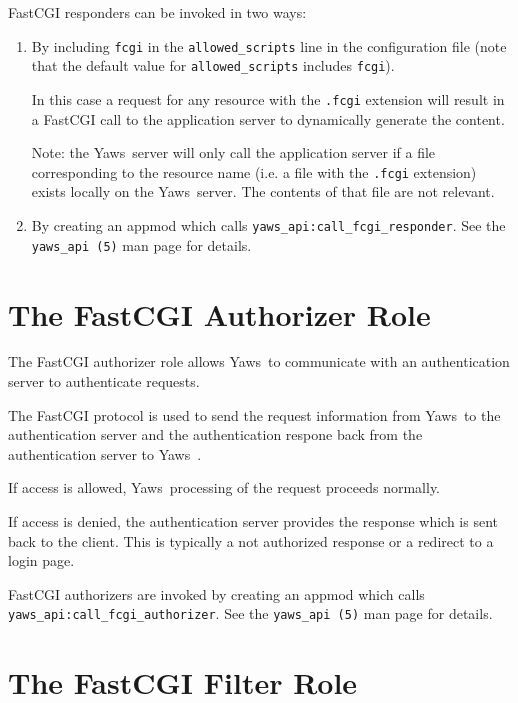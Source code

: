 \documentclass[11pt,oneside,english]{book}
\newcommand{\Yaws}            %
        {{\sc Yaws}}
\begin{document}
FastCGI responders can be invoked in two ways:

\begin{enumerate}

\item
By including \verb+fcgi+ in the \verb+allowed_scripts+ line
in the configuration file (note that the default value for
\verb+allowed_scripts+ includes \verb+fcgi+).

In this case a request for any resource with the \verb+.fcgi+
extension will result in a FastCGI call to the application server to
dynamically generate the content.

Note: the \Yaws\  server will only call the application server if a file
corresponding to the resource name (i.e. a file with the \verb+.fcgi+
extension) exists locally on the \Yaws\  server. The contents of that
file are not relevant.

\item
By creating an appmod which calls \verb+yaws_api:call_fcgi_responder+.
See the \verb+yaws_api (5)+ man page for details.

\end{enumerate}

\section{The FastCGI Authorizer Role}

The FastCGI authorizer role allows \Yaws\  to communicate with an
authentication server to authenticate requests.

The FastCGI protocol is used to send the request information from
\Yaws\  to the authentication server and the authentication respone back
from the authentication server to \Yaws\ .

If access is allowed, \Yaws\  processing of the request proceeds
normally.

If access is denied, the authentication server provides the
response which is sent back to the client. This is typically
a not authorized response or a redirect to a login page.

FastCGI authorizers are invoked by creating an appmod which
calls \verb+yaws_api:call_fcgi_authorizer+.
See the \verb+yaws_api (5)+ man page for details.

\section{The FastCGI Filter Role}
\end{document}
